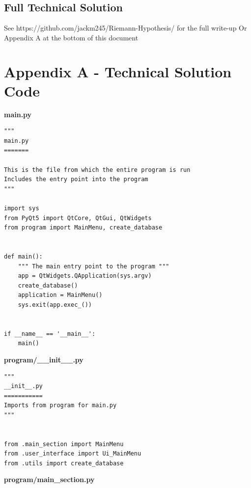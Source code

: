 \documentclass{article}
\begin{document}
\subsection{Full Technical Solution}

See https://github.com/jackm245/Riemann-Hypothesis/ for the full write-up
Or Appendix A at the bottom of this document

\clearpage
\section{Appendix A - Technical Solution Code}

\textbf{main.py}

\begin{lstlisting}
"""
main.py
=======

This is the file from which the entire program is run
Includes the entry point into the program
"""

import sys
from PyQt5 import QtCore, QtGui, QtWidgets
from program import MainMenu, create_database


def main():
    """ The main entry point to the program """
    app = QtWidgets.QApplication(sys.argv)
    create_database()
    application = MainMenu()
    sys.exit(app.exec_())


if __name__ == '__main__':
    main()
\end{lstlisting}

\textbf{program/\_\_init\_\_.py}

\begin{lstlisting}
"""
__init__.py
===========
Imports from program for main.py
"""


from .main_section import MainMenu
from .user_interface import Ui_MainMenu
from .utils import create_database
\end{lstlisting}


\textbf{program/main\_section.py}
\end{document}
